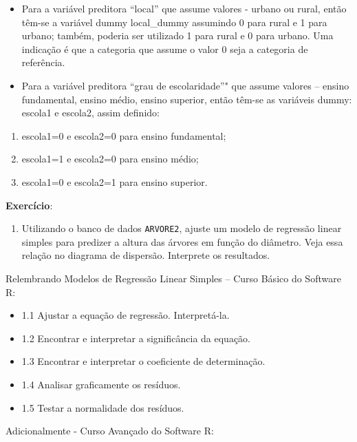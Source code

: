 \documentclass[12pt,brazil,]{book}
\providecommand{\tightlist}{%
  \setlength{\itemsep}{0pt}\setlength{\parskip}{0pt}}
\begin{document}
\begin{itemize}
\item
  Para a variável preditora ``local'' que assume valores - urbano ou
  rural, então têm-se a variável dummy local\_dummy assumindo 0 para
  rural e 1 para urbano; também, poderia ser utilizado 1 para rural e 0
  para urbano. Uma indicação é que a categoria que assume o valor 0 seja
  a categoria de referência.
\item
  Para a variável preditora ``grau de escolaridade''" que assume valores
  -- ensino fundamental, ensino médio, ensino superior, então têm-se as
  variáveis dummy: escola1 e escola2, assim definido:
\end{itemize}

\begin{enumerate}
\def\labelenumi{\alph{enumi}.}
\tightlist
\item
  escola1=0 e escola2=0 para ensino fundamental;
\item
  escola1=1 e escola2=0 para ensino médio;
\item
  escola1=0 e escola2=1 para ensino superior.
\end{enumerate}

\textbf{Exercício}:

\begin{enumerate}
\def\labelenumi{\arabic{enumi})}
\tightlist
\item
  Utilizando o banco de dados \texttt{ARVORE2}, ajuste um modelo de
  regressão linear simples para predizer a altura das árvores em função
  do diâmetro. Veja essa relação no diagrama de dispersão. Interprete os
  resultados.
\end{enumerate}

Relembrando Modelos de Regressão Linear Simples -- Curso Básico do
Software R:

\begin{itemize}
\tightlist
\item
  1.1 Ajustar a equação de regressão. Interpretá-la.
\item
  1.2 Encontrar e interpretar a significância da equação.
\item
  1.3 Encontrar e interpretar o coeficiente de determinação.
\item
  1.4 Analisar graficamente os resíduos.
\item
  1.5 Testar a normalidade dos resíduos.
\end{itemize}

Adicionalmente - Curso Avançado do Software R:
\end{document}
